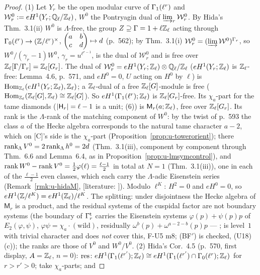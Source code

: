 \documentclass[11pt]{article}
\newcommand{\LIT}[1]{\textsf{[literature: #1]}}   %
\newcommand{\VERIFYloc}{\textsf{VERIFY}}          %
\newcommand{\Iw}{\Lambda}                         %
\newcommand{\Zl}{\Z_\ell}
\newcommand{\Ql}{\Q_\ell}
\newcommand{\GaT}[1]{\Ga^{\mathrm t}_{#1}}            %
\begin{document}
\begin{proof}
(1) Let $Y_r$ be the open modular curve of $\Gamma_1(\ell^{r})$ and $\mathcal W^{0}_r:=eH^{1}(Y_r;\Ql/\Zl)$, $W^{0}$ the Pontryagin dual of $\varinjlim_r\mathcal W^{0}_r$. By Hida's Thm.~3.1(ii) $W^{0}$ is
$\Iw$-free, the group $Z\supseteq\Ga=1+\ell\Zl$ acting through $\Gamma_0(\ell^{r})\to(\mathbb{Z}/\ell^{r})^{\times}$, $\begin{pmatrix} a & b \\ c & d \end{pmatrix}\mapsto d$ (p.~562); by Thm.~3.1(i) $\mathcal W^{0}_r=(\varinjlim\mathcal W^{0})^{\Gamma_r}$, so
$W^{0}/(\gamma_r-1)W^{0}$, $\gamma_r=u^{\ell^{r-1}}$, is the dual of $\mathcal W^{0}_r$ and is free over $\Zl[\Ga/\Ga_r]=\Zl[G_r]$. The dual of $\mathcal W^{0}_r=eH^{1}(Y_r;\Zl)\otimes\Ql/\Zl$ ($eH^{1}(Y_r;\Zl)$ is
$\Zl$-free: Lemma~4.6, p.~571, and $eH^{0}=0$, $U$ acting on $H^{0}$ by $\ell$) is $\Hom_{\Zl}(eH^{1}(Y_r;\Zl),\Zl)$; a $\Zl$-dual of a free $\Zl[G]$-module is free ($\Hom_{\Zl}(\Zl[G],\Zl)\cong\Zl[G]$).
So $eH^{1}(\Ga_1(\ell^{r});\Zl)$ is $\Zl[G_r]$-free. Its $\chi_a$-part for the tame diamonds ($\left| \mathsf H_r \right|=\ell-1$ is a unit; (6)) is $\mathsf M_r(a;\Zl)$, free over $\Zl[G_r]$. Its rank is
the $\Iw$-rank of the matching component of $W^{0}$: by the twist of p.~593 the class $a$ of the Hecke algebra corresponds to the natural tame character $a-2$, which on [C]'s side is the
$\chi_a$-part (Proposition~\ref{prop:u-towerorient}); there $\rank_\Iw V^{0}=2\rank_\Iw h^{0}=2d$ (Thm.~3.1(iii), component by component through Thm.~6.6 and Lemma~6.4, as in
Proposition~\ref{prop:u-lmsymcontrol}), and $\operatorname{rank} W^{0}-\operatorname{rank} V^{0}=\tfrac12\varphi(\ell)=\tfrac{\ell-1}2$ in total at $N=1$ (Thm.~3.1(iii)), one in each of the $\tfrac{\ell-1}2$ even classes, which each
carry the $\Iw$-adic Eisenstein series (Remark~\ref{rmk:u-hidaM}, \LIT{\cite[Thm.~7.2, p.~272]{hida_ens}}). Modulo $\ell^{K}$: $H^{2}=0$ and $eH^{0}=0$, so $eH^{1}(\Z/\ell^{K})=eH^{1}(\Zl)/\ell^{K}$. The
splitting: under disjointness the Hecke algebra of $\mathsf M_r$ is a product, and the residual systems of the cuspidal factor are not boundary systems (the boundary of $\GaT r$ carries the
Eisenstein systems $\varphi(p)+\psi(p)p$ of $E_2(\varphi,\psi)$, $\varphi\psi=\chi_a\cdot(\text{wild})$, residually $\omega^{b}(p)+\omega^{a-2-b}(p)p$ --- \STD{\cite[Thm.~4.5.2, 4.6.2]{diamond_shurman}
\VERIFYloc};  is level~$1$ with trivial character and does \emph{not} cover this, F-U5 m8; (BF$'$) is checked, (U18)(c)); the ranks are those of $V^{0}$ and $W^{0}/V^{0}$.
(2) Hida's Cor.~4.5 (p.~570, first display, $A=\Zl$, $n=0$): $\mathrm{res}\colon eH^{1}(\Ga_1(\ell^{r'});\Zl)\cong eH^{1}(\Ga_1(\ell^{r'})\cap\Ga_0(\ell^{r});\Zl)$ for $r>r'>0$; take $\chi_a$-parts; and

\end{proof}
\end{document}
